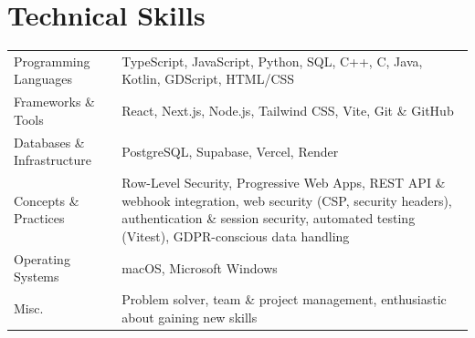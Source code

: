\documentclass[11pt,a4paper]{article}
\begin{document}
\section*{Technical Skills}
\begin{tabular}{@{}p{5cm} p{11.5cm}@{}}
  Programming Languages & TypeScript, JavaScript, Python, SQL, C++, C, Java, Kotlin, GDScript, HTML/CSS \\
  Frameworks \& Tools & React, Next.js, Node.js, Tailwind CSS, Vite, Git \& GitHub \\
  Databases \& Infrastructure & PostgreSQL, Supabase, Vercel, Render \\
  Concepts \& Practices & Row-Level Security, Progressive Web Apps, REST API \& webhook integration, web security (CSP, security headers), authentication \& session security, automated testing (Vitest), GDPR-conscious data handling \\
  Operating Systems & macOS, Microsoft Windows \\
  Misc. & Problem solver, team \& project management, enthusiastic about gaining new skills \\
\end{tabular}
\end{document}
